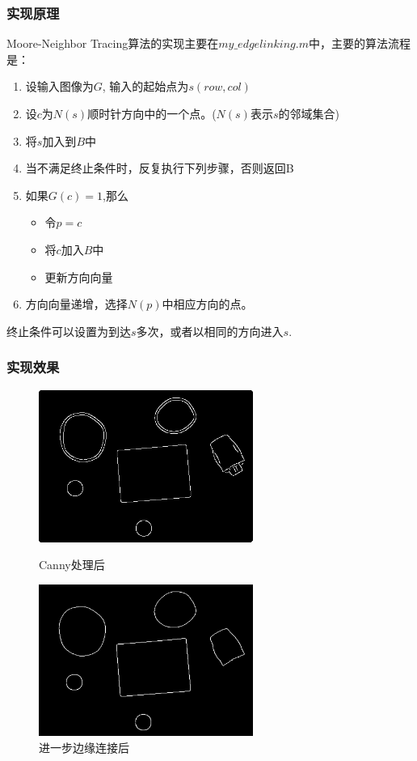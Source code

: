 \documentclass[11pt, a4paper, UTF8]{ctexart}
\begin{document}
\subsubsection{实现原理}
Moore-Neighbor Tracing算法的实现主要在$my\_edgelinking.m$中，主要的算法流程是：
  \begin{enumerate}
    \item 设输入图像为$G$, 输入的起始点为$s(row,col)$
    \item 设$c$为$N(s)$顺时针方向中的一个点。($N(s)$表示$s$的邻域集合)
    \item 将$s$加入到$B$中
    \item 当不满足终止条件时，反复执行下列步骤，否则返回B
    \item 如果$G(c)=1$,那么
      \begin{itemize}
        \item 令$p=c$
        \item 将$c$加入$B$中
        \item 更新方向向量
      \end{itemize}
    \item 方向向量递增，选择$N(p)$中相应方向的点。
  \end{enumerate}

终止条件可以设置为到达$s$多次，或者以相同的方向进入$s$.


\subsubsection{实现效果}

\begin{figure}[H]
  \centering
  \begin{minipage}[t]{0.48\textwidth}
  \centering
  \includegraphics[width=7cm]{Canny_TH=0.02_TL=0.01_rubberband_cap.png}
  \caption{Canny处理后}
  \end{minipage}
  \begin{minipage}[t]{0.48\textwidth}
  \centering
  \includegraphics[width=7cm]{contour_full.png}
  \caption{进一步边缘连接后}
  \end{minipage}
\end{figure}
\end{document}
